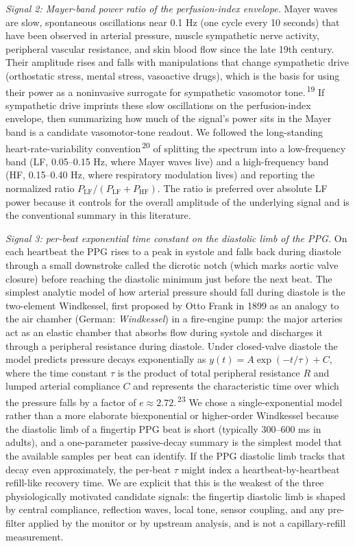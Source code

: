 \documentclass[twocolumn,letterpaper,10pt]{article}
\renewcommand{\cite}[1]{\textsuperscript{\,#1}}
\begin{document}
\textit{Signal 2: Mayer-band power ratio of the perfusion-index envelope.} Mayer waves are slow, spontaneous oscillations near 0.1 Hz (one cycle every 10 seconds) that have been observed in arterial pressure, muscle sympathetic nerve activity, peripheral vascular resistance, and skin blood flow since the late 19th century. Their amplitude rises and falls with manipulations that change sympathetic drive (orthostatic stress, mental stress, vasoactive drugs), which is the basis for using their power as a noninvasive surrogate for sympathetic vasomotor tone.\cite{19} If sympathetic drive imprints these slow oscillations on the perfusion-index envelope, then summarizing how much of the signal's power sits in the Mayer band is a candidate vasomotor-tone readout. We followed the long-standing heart-rate-variability convention\cite{20} of splitting the spectrum into a low-frequency band (LF, 0.05--0.15 Hz, where Mayer waves live) and a high-frequency band (HF, 0.15--0.40 Hz, where respiratory modulation lives) and reporting the normalized ratio $P_{\mathrm{LF}}/(P_{\mathrm{LF}}+P_{\mathrm{HF}})$. The ratio is preferred over absolute LF power because it controls for the overall amplitude of the underlying signal and is the conventional summary in this literature.

\textit{Signal 3: per-beat exponential time constant on the diastolic limb of the PPG.} On each heartbeat the PPG rises to a peak in systole and falls back during diastole through a small downstroke called the dicrotic notch (which marks aortic valve closure) before reaching the diastolic minimum just before the next beat. The simplest analytic model of how arterial pressure should fall during diastole is the two-element Windkessel, first proposed by Otto Frank in 1899 as an analogy to the air chamber (German: \textit{Windkessel}) in a fire-engine pump: the major arteries act as an elastic chamber that absorbs flow during systole and discharges it through a peripheral resistance during diastole. Under closed-valve diastole the model predicts pressure decays exponentially as $y(t) = A\exp(-t/\tau) + C$, where the time constant $\tau$ is the product of total peripheral resistance $R$ and lumped arterial compliance $C$ and represents the characteristic time over which the pressure falls by a factor of $e \approx 2.72$.\cite{23} We chose a single-exponential model rather than a more elaborate biexponential or higher-order Windkessel because the diastolic limb of a fingertip PPG beat is short (typically 300--600 ms in adults), and a one-parameter passive-decay summary is the simplest model that the available samples per beat can identify. If the PPG diastolic limb tracks that decay even approximately, the per-beat $\tau$ might index a heartbeat-by-heartbeat refill-like recovery time. We are explicit that this is the weakest of the three physiologically motivated candidate signals: the fingertip diastolic limb is shaped by central compliance, reflection waves, local tone, sensor coupling, and any pre-filter applied by the monitor or by upstream analysis, and is not a capillary-refill measurement.
\end{document}
